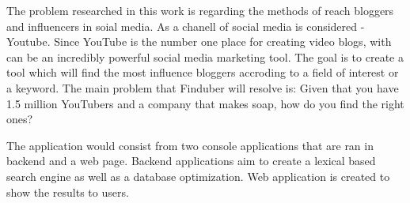The problem researched in this work is regarding the methods of reach bloggers and influencers in soial media. As a chanell of social media is considered - Youtube. Since YouTube is the number one place for creating video blogs, with can be an incredibly powerful social media marketing tool. The goal is to create a tool which will find the most influence bloggers accroding to a field of interest or a keyword. The main problem that Finduber will resolve is: Given that you have 1.5 million YouTubers and a company that makes soap, how do you find the right ones?


The application would consist from two console applications that are ran in backend and a web page. Backend applications aim to create a lexical based search engine as well as a database optimization. Web application is created to show the results to users.

\clearpage